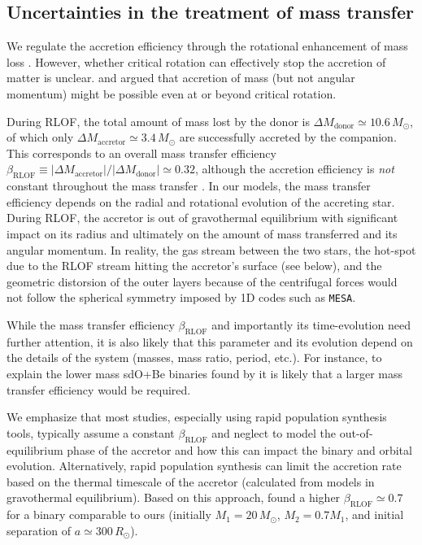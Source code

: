 \documentclass[twocolumn,twocolappendix,trackchanges]{aastex63}
\begin{document}

\subsection{Uncertainties in the treatment of mass transfer}
\label{sec:bin_param}

We regulate the accretion efficiency through the rotational
enhancement of mass loss \citep[e.g.,][]{langer:98}.
However, whether critical rotation can effectively stop the accretion
of matter is unclear. \cite{popham:91} and \cite{paczynski:91}
argued that accretion of mass (but not angular momentum) might be
possible even at or beyond critical rotation.

During RLOF, the total amount of mass lost by the donor is
$\Delta M_\mathrm{donor} \simeq 10.6\,M_\odot$, of which only
$\Delta M_\mathrm{accretor}\simeq 3.4\,M_\odot$ are successfully
accreted by the companion. This corresponds to an overall mass transfer efficiency
$\beta_\mathrm{RLOF}\equiv |\Delta M_\mathrm{accretor}|/|\Delta M_\mathrm{donor}| \simeq 0.32$,
although the accretion efficiency is \emph{not} constant throughout
the mass transfer \citep[e.g.,][]{vanrensbergen:06}. In our models,
the mass transfer efficiency depends on the radial and rotational
evolution of the accreting star. During RLOF, the accretor is out of
gravothermal equilibrium with significant impact on its radius and
ultimately on the amount of mass transferred and its angular
momentum. In reality, the gas stream between the two stars, the
hot-spot due to the RLOF stream hitting the accretor's surface (see below), and
the geometric distorsion of the outer layers because of the
centrifugal forces would not follow the spherical symmetry imposed by
1D codes such as \texttt{MESA}.

While the mass transfer efficiency $\beta_\mathrm{RLOF}$ and
importantly its time-evolution need further attention, it is also
likely that this parameter and its evolution depend on the details of
the system (masses, mass ratio, period, etc.). For instance, to
explain the lower mass sdO+Be binaries found by \cite{wang:21_sdOBe} it is likely
that a larger mass transfer efficiency would be required.


We emphasize that most studies, especially using rapid population
synthesis tools, typically assume a constant $\beta_\mathrm{RLOF}$ and
neglect to model the out-of-equilibrium phase of the accretor and how
this can impact the binary and orbital evolution. Alternatively, rapid
population synthesis can limit the accretion rate based on the thermal
timescale of the accretor (calculated from models in gravothermal
equilibrium). Based on this approach, \cite{schneider:15} found a
higher $\beta_\mathrm{RLOF}\simeq 0.7$ for a binary comparable to ours
(initially $M_1=20\,M_\odot$, $M_2=0.7M_1$, and initial separation of
$a\simeq300\,R_\odot$).
\end{document}
